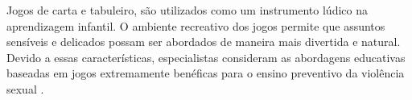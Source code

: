 Jogos de carta e tabuleiro, %
são utilizados como um instrumento lúdico na aprendizagem infantil. O ambiente recreativo dos jogos permite que assuntos sensíveis e delicados possam ser abordados de maneira mais divertida e natural. Devido a essas características, especialistas consideram as abordagens educativas baseadas em jogos extremamente benéficas para o ensino preventivo da violência sexual \cite{meyer2017analise}. 
















